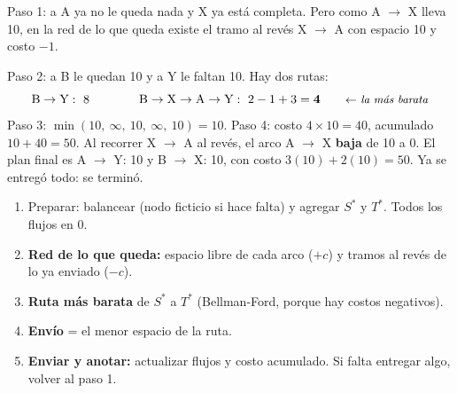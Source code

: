 \documentclass[11pt,a4paper]{article}
\newcommand{\Sini}{\ensuremath{S^{*}}}
\newcommand{\Tfin}{\ensuremath{T^{*}}}
\newcommand{\ra}{\ensuremath{\to}}
\begin{document}
Paso 1: a A ya no le queda nada y X ya está completa. Pero como A \ra{} X lleva 10, en la red de lo que queda
existe el tramo al revés X \ra{} A con espacio 10 y costo $-1$.

Paso 2: a B le quedan 10 y a Y le faltan 10. Hay dos rutas:
\[
\text{B} \to \text{Y}: \ 8 \qquad\qquad \text{B} \to \text{X} \to \text{A} \to \text{Y}: \ 2 - 1 + 3 = \mathbf{4}
\nota{la más barata}
\]
Paso 3: $\min(10,\ \infty,\ 10,\ \infty,\ 10) = 10$. \quad
Paso 4: costo $4 \times 10 = 40$, acumulado $10 + 40 = 50$. Al recorrer X \ra{} A al revés, el arco A \ra{} X
\textbf{baja} de 10 a 0. El plan final es A \ra{} Y: 10 y B \ra{} X: 10, con costo $3(10) + 2(10) = 50$. Ya se entregó
todo: se terminó.

\noindent
\begin{minipage}[c]{0.50\textwidth}
\begin{idea}
\begin{enumerate}[leftmargin=*, itemsep=3pt]
  \item[\textbf{0.}] Preparar: balancear (nodo ficticio si hace falta) y agregar \Sini{} y \Tfin. Todos los flujos en 0.
  \item \textbf{Red de lo que queda:} espacio libre de cada arco ($+c$) y tramos al revés de lo ya enviado ($-c$).
  \item \textbf{Ruta más barata} de \Sini{} a \Tfin{} (Bellman-Ford, porque hay costos negativos).
  \item \textbf{Envío} = el menor espacio de la ruta.
  \item \textbf{Enviar y anotar:} actualizar flujos y costo acumulado. Si falta entregar algo, volver al paso 1.
\end{enumerate}
\end{idea}
\end{minipage}\hfill
\end{document}
